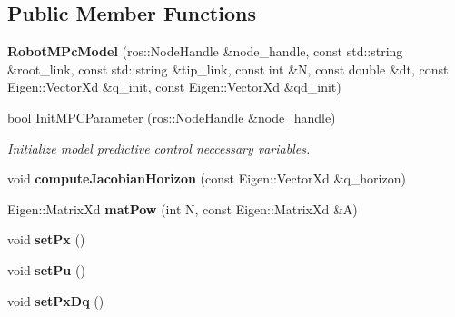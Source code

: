 \subsection*{Public Member Functions}
\begin{DoxyCompactItemize}
\item 
\mbox{\label{classrobot_1_1_robot_m_pc_model_a22b82cd8b5fe7643f2af1b4a11f9c744}} 
{\bfseries Robot\+M\+Pc\+Model} (ros\+::\+Node\+Handle \&node\+\_\+handle, const std\+::string \&root\+\_\+link, const std\+::string \&tip\+\_\+link, const int \&N, const double \&dt, const Eigen\+::\+Vector\+Xd \&q\+\_\+init, const Eigen\+::\+Vector\+Xd \&qd\+\_\+init)
\item 
bool \hyperlink{classrobot_1_1_robot_m_pc_model_ac8379e021bfb668187bb8f522185f528}{Init\+M\+P\+C\+Parameter} (ros\+::\+Node\+Handle \&node\+\_\+handle)
\begin{DoxyCompactList}\small\item\em Initialize model predictive control neccessary variables. \end{DoxyCompactList}\item 
\mbox{\label{classrobot_1_1_robot_m_pc_model_a50ae09e4be788615164dfe6773c7b93a}} 
void {\bfseries compute\+Jacobian\+Horizon} (const Eigen\+::\+Vector\+Xd \&q\+\_\+horizon)
\item 
\mbox{\label{classrobot_1_1_robot_m_pc_model_a7d82488a3f3645431acd32b68eb0a6cf}} 
Eigen\+::\+Matrix\+Xd {\bfseries mat\+Pow} (int N, const Eigen\+::\+Matrix\+Xd \&A)
\item 
\mbox{\label{classrobot_1_1_robot_m_pc_model_aef11efa7a455fea42f2d114d7900f85f}} 
void {\bfseries set\+Px} ()
\item 
\mbox{\label{classrobot_1_1_robot_m_pc_model_a68f44644cb8ff25cd6f730cf5b61c4a2}} 
void {\bfseries set\+Pu} ()
\item 
\mbox{\label{classrobot_1_1_robot_m_pc_model_a2ff10f6466495ebc82dd2a8bfdb485ad}} 
void {\bfseries set\+Px\+Dq} ()
\item 
\mbox{\label{classrobot_1_1_robot_m_pc_model_a15b2bb377438216ac141fe60f76ee26b}} 

\end{DoxyCompactItemize}
